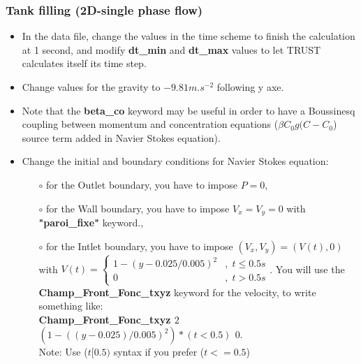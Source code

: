 \documentclass[10pt]{beamer}
\begin{document}
\begin{frame}
\frametitle{Tank filling (2D-single phase flow)}
\begin{block}{}

\begin{itemize}
\item In the data file, change the values in the time scheme to finish the calculation at 1
second, and modify \textbf{dt\_min} and \textbf{dt\_max} values to let TRUST calculates itself its
time step.

\item Change values for the gravity to $-9.81 m.s^{-2}$ following y axe.

\item Note that the \textbf{beta\_co} keyword may be useful in order to have a Boussinesq coupling between momentum and concentration equations ($\beta C_0 g(C-C_0$) source term added in Navier Stokes equation).

\item Change the initial and boundary conditions for Navier Stokes equation:
    \begin{itemize}
    \item [$\circ$] for the Outlet boundary, you have to impose $P=0$,
    \item [$\circ$] for the Wall boundary, you have to impose $V_x=V_y=0$ with \textbf{"paroi\_fixe"} keyword.,
    \item [$\circ$] for the Intlet boundary, you have to impose $(V_{x},V_{y})=(V(t),0)$ with 
    $V(t)=  
    \begin{cases}  
    1-(y-0.025/0.005)^{2} & ,\; t\leq0.5s\\
    0 & ,\; t>0.5s
    \end{cases}
    $. You will use the \textbf{Champ\_Front\_Fonc\_txyz} keyword for the velocity, to write something like: \\
    \textbf{Champ\_Front\_Fonc\_txyz $2$ $(1-((y-0.025)/0.005)^2)*(t<0.5)$ $0.$}\\
    Note: Use ($t[0.5)$ syntax if you prefer ($t<=0.5$)
    \end{itemize}
\end{itemize}

\end{block}
\end{frame}
\end{document}
